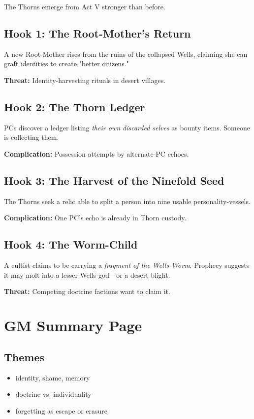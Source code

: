 \documentclass[11pt]{book}
\begin{document}
The Thorns emerge from Act V stronger than before.

\subsection{Hook 1: The Root-Mother's Return}
A new Root-Mother rises from the ruins of the collapsed Wells, claiming
she can graft identities to create "better citizens."

\textbf{Threat:} Identity-harvesting rituals in desert villages.

\subsection{Hook 2: The Thorn Ledger}
PCs discover a ledger listing \emph{their own discarded selves} as
bounty items. Someone is collecting them.

\textbf{Complication:} Possession attempts by alternate-PC echoes.

\subsection{Hook 3: The Harvest of the Ninefold Seed}
The Thorns seek a relic able to split a person into nine
usable personality-vessels.

\textbf{Complication:} One PC's echo is already in Thorn custody.

\subsection{Hook 4: The Worm-Child}
A cultist claims to be carrying a \emph{fragment of the Wells-Worm}.
Prophecy suggests it may molt into a lesser Wells-god---or a desert blight.

\textbf{Threat:} Competing doctrine factions want to claim it.

\section{GM Summary Page}

\subsection{Themes}
\begin{itemize}
    \item identity, shame, memory
    \item doctrine vs. individuality
    \item forgetting as escape or erasure
\end{itemize}
\end{document}
